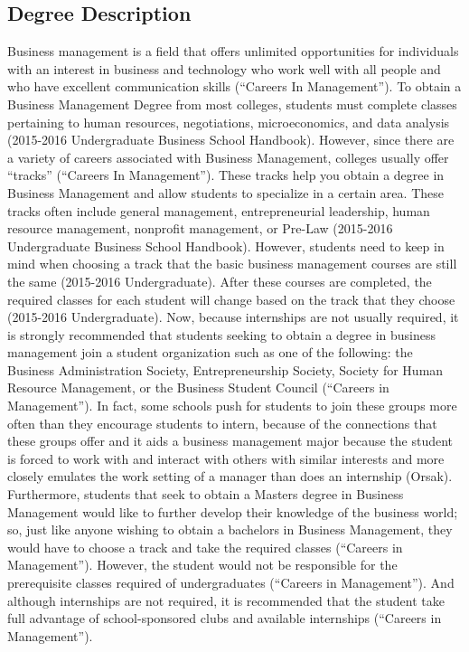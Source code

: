 \begin{multicols}{2}

\section{Degree Description}
    Business management is a field that offers unlimited opportunities for individuals with an interest in business and technology who work well with all people and who have excellent communication skills (“Careers In Management”). To obtain a Business Management Degree from most colleges, students must complete classes pertaining to human resources, negotiations, microeconomics, and data analysis (2015-2016 Undergraduate Business School Handbook). However, since there are a variety of careers associated with Business Management, colleges usually offer “tracks” (“Careers In Management”). These tracks help you obtain a degree in Business Management and allow students to specialize in a certain area. These tracks often include general management, entrepreneurial leadership, human resource management, nonprofit management, or Pre-Law (2015-2016 Undergraduate Business School Handbook). However, students need to keep in mind when choosing a track that the basic business management courses are still the same (2015-2016 Undergraduate). After these courses are completed, the required classes for each student will change based on the track that they choose (2015-2016 Undergraduate). Now, because internships are not usually required, it is strongly recommended that students seeking to obtain a degree in business management join a student organization such as one of the following: the Business Administration Society, Entrepreneurship Society, Society for Human Resource Management, or the Business Student Council (“Careers in Management”). In fact, some schools push for students to join these groups more often than they encourage students to intern, because of the connections that these groups offer and it aids a business management major because the student is forced to work with and interact with others with similar interests and more closely emulates the work setting of a manager than does an internship (Orsak). Furthermore, students that seek to obtain a Masters degree in Business Management would like to further develop their knowledge of the business world; so, just like anyone wishing to obtain a bachelors in Business Management, they would have to choose a track and take the required classes (“Careers in Management”). However, the student would not be responsible for the prerequisite classes required of undergraduates (“Careers in Management”). And although internships are not required, it is recommended that the student take full advantage of school-sponsored clubs and available internships (“Careers in Management”).

\end{multicols}
